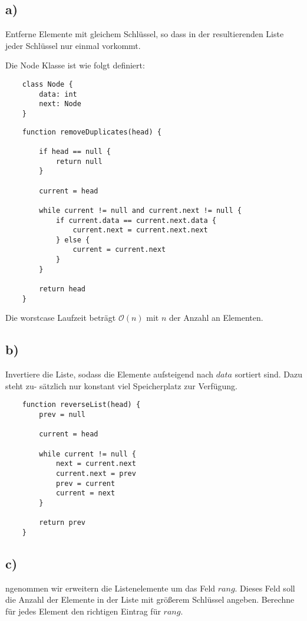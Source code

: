 \documentclass[a4paper]{article}
\begin{document}
\subsection*{a)}
Entferne Elemente mit gleichem Schlüssel, so dass in der resultierenden Liste jeder Schlüssel
nur einmal vorkommt.

Die Node Klasse ist wie folgt definiert:
\begin{verbatim}
    class Node {
        data: int
        next: Node
    }
\end{verbatim}


\begin{verbatim}
    function removeDuplicates(head) {

        if head == null {
            return null
        }

        current = head

        while current != null and current.next != null {
            if current.data == current.next.data {
                current.next = current.next.next
            } else {
                current = current.next
            }
        }
    
        return head
    }
\end{verbatim}
Die worstcase Laufzeit beträgt $\mathcal{O}(n)$ mit $n$ der Anzahl an Elementen.

\break

\subsection*{b)}
Invertiere die Liste, sodass die Elemente aufsteigend nach $data$ sortiert sind. Dazu steht zu-
sätzlich nur konstant viel Speicherplatz zur Verfügung.

\begin{verbatim}
    function reverseList(head) {
        prev = null
        
        current = head
        
        while current != null {
            next = current.next
            current.next = prev
            prev = current
            current = next
        }
        
        return prev
    }
\end{verbatim}

\subsection*{c)}
ngenommen wir erweitern die Listenelemente um das Feld $rang$. Dieses Feld soll die Anzahl
der Elemente in der Liste mit größerem Schlüssel angeben. Berechne für jedes Element den
richtigen Eintrag für $rang$.
\end{document}

